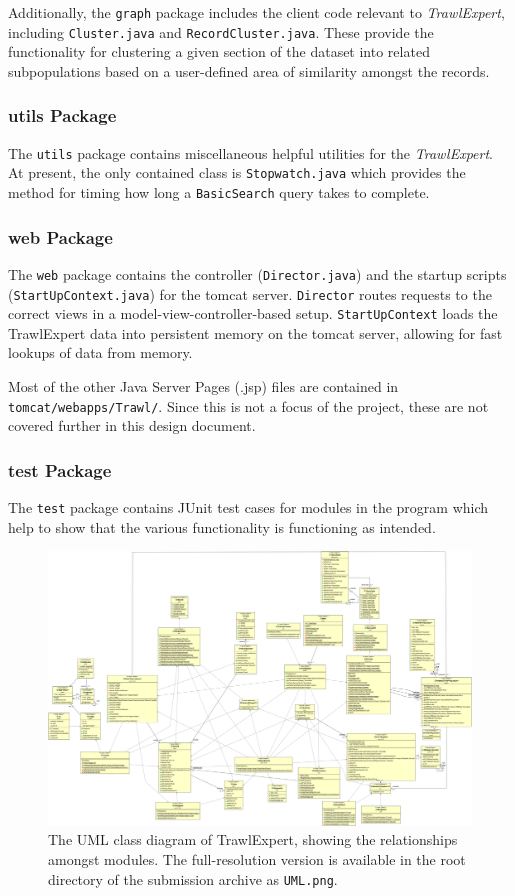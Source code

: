 \documentclass{article}
\begin{document}
Additionally, the \texttt{graph} package includes the client code relevant to \textit{TrawlExpert}, including \texttt{Cluster.java} and \texttt{RecordCluster.java}. These provide the functionality for clustering a given section of the dataset into related subpopulations based on a user-defined area of similarity amongst the records.

\subsubsection{utils Package}
The \texttt{utils} package contains miscellaneous helpful utilities for the \textit{TrawlExpert}. At present, the only contained class is \texttt{Stopwatch.java} which provides the method for timing how long a \texttt{BasicSearch} query takes to complete.

\subsubsection{web Package}
The \texttt{web} package contains the controller (\texttt{Director.java}) and the startup scripts (\texttt{StartUpContext.java}) for the tomcat server. \texttt{Director} routes requests to the correct views in a model-view-controller-based setup. \texttt{StartUpContext} loads the TrawlExpert data into persistent memory on the tomcat server, allowing for fast lookups of data from memory. 

Most of the other Java Server Pages (.jsp) files are contained in \texttt{tomcat/webapps/Trawl/}. Since this is not a focus of the project, these are not covered further in this design document.

\subsubsection{test Package}
The \texttt{test} package contains JUnit test cases for modules in the program which help to show that the various functionality is functioning as intended.

\begin{figure}
\centering
\includegraphics[angle=90,width=14cm]{../UML.png}
\caption{The UML class diagram of TrawlExpert, showing the relationships amongst modules. The full-resolution version is available in the root directory of the submission archive as \texttt{UML.png}.}
\label{fig:UML}
\end{figure}
\end{document}
